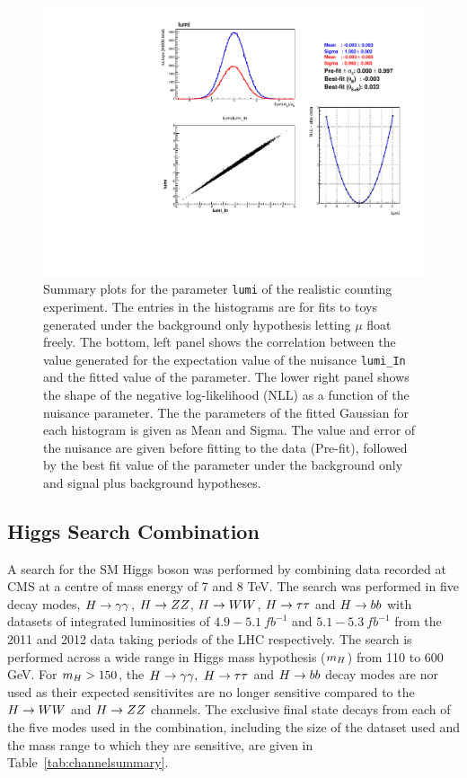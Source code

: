 \begin{figure}[hbtp]
  \begin{center}
    \includegraphics[width=\textwidth]{combinations/diagnostics/tree_fit_sb_lumi.pdf}
    \caption{Summary plots for the parameter \texttt{lumi} of the realistic counting experiment. 
	The entries in the histograms are for fits to toys generated under the background only
	hypothesis letting $\mu$ float freely. The bottom, left panel shows the correlation
	between the value generated for the expectation value of the nuisance 
	\texttt{lumi\_In} and the fitted value of the parameter. 
	The lower right panel shows the shape of the 
	negative log-likelihood (NLL) as a function of the nuisance parameter.
	The the parameters of the fitted Gaussian for each histogram is given as 
	Mean and Sigma. The value and error of the nuisance are given before fitting
	to the data (Pre-fit), followed by the best fit value of the parameter 
	under the background only and signal plus background hypotheses.}
    \label{fig:real_lumi_s}
  \end{center}
\end{figure}

\subsection{Higgs Search Combination}
\label{combinedsearchresults}

A search for the SM Higgs boson was performed by combining data recorded at CMS 
at a centre of mass energy of 7 and 8 TeV. The search was performed in five
decay modes, $H\rightarrow\gamma\gamma$, $H\rightarrow ZZ$, $H\rightarrow WW$, $H\rightarrow\tau\tau$ and $H\rightarrow bb$ with datasets of
integrated luminosities of $4.9-5.1~fb^{-1}$ and $5.1-5.3~fb^{-1}$
from the 2011 and 2012 data taking periods of the LHC respectively.
The search is performed across a wide range in Higgs mass hypothesis ($m_{H}$) 
from 110 to 600 GeV. For $m_{H}>150$, the $H\rightarrow\gamma\gamma,~H\rightarrow\tau\tau$ and $H\rightarrow bb$ decay modes are nor used
as their expected sensitivites are no longer sensitive compared to the $H\rightarrow WW$ and
$H\rightarrow ZZ$ channels. The exclusive final state decays from each of the five modes used 
in the combination, including the size of the dataset used and the mass range to
which they are sensitive, are given in Table~\ref{tab:channelsummary}.

